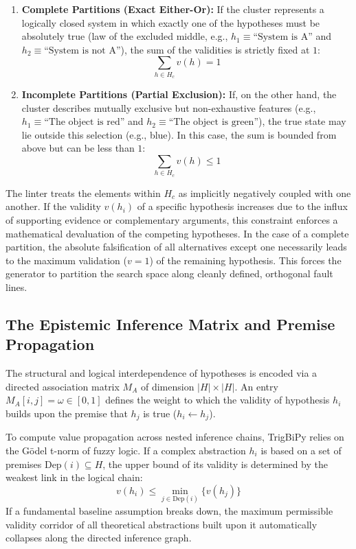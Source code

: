 \documentclass[11pt, a4paper]{article}
\begin{document}
	\begin{enumerate}
		\item \textbf{Complete Partitions (Exact Either-Or):} If the cluster represents a logically closed system in which exactly one of the hypotheses must be absolutely true (law of the excluded middle, e.g., $h_1 \equiv \text{``System is A''}$ and $h_2 \equiv \text{``System is not A''}$), the sum of the validities is strictly fixed at $1$:
		\[
		\sum_{h \in H_c} v(h) = 1
		\]
		
		\item \textbf{Incomplete Partitions (Partial Exclusion):} If, on the other hand, the cluster describes mutually exclusive but non-exhaustive features (e.g., $h_1 \equiv \text{``The object is red''}$ and $h_2 \equiv \text{``The object is green''}$), the true state may lie outside this selection (e.g., blue). In this case, the sum is bounded from above but can be less than $1$:
		\[
		\sum_{h \in H_c} v(h) \le 1
		\]
	\end{enumerate}
	
	The linter treats the elements within $H_c$ as implicitly negatively coupled with one another. If the validity $v(h_i)$ of a specific hypothesis increases due to the influx of supporting evidence or complementary arguments, this constraint enforces a mathematical devaluation of the competing hypotheses. In the case of a complete partition, the absolute falsification of all alternatives except one necessarily leads to the maximum validation ($v=1$) of the remaining hypothesis. This forces the generator to partition the search space along cleanly defined, orthogonal fault lines.
	
	\subsection{The Epistemic Inference Matrix and Premise Propagation}
	The structural and logical interdependence of hypotheses is encoded via a directed association matrix $M_A$ of dimension $|H| \times |H|$. An entry $M_A[i, j] = \omega \in [0, 1]$ defines the weight to which the validity of hypothesis $h_i$ builds upon the premise that $h_j$ is true ($h_i \leftarrow h_j$).
	
	To compute value propagation across nested inference chains, TrigBiPy relies on the Gödel t-norm of fuzzy logic. If a complex abstraction $h_i$ is based on a set of premises $\text{Dep}(i) \subseteq H$, the upper bound of its validity is determined by the weakest link in the logical chain:
	\[
	v(h_i) \le \min_{j \in \text{Dep}(i)} \{ v(h_j) \}
	\]
	If a fundamental baseline assumption breaks down, the maximum permissible validity corridor of all theoretical abstractions built upon it automatically collapses along the directed inference graph.
	
\end{document}
